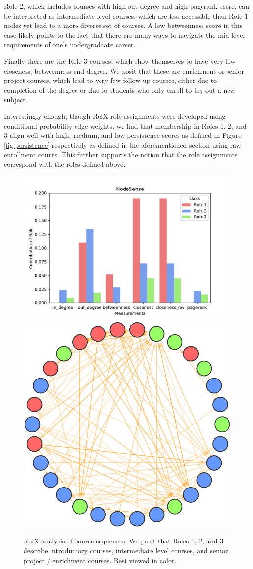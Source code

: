 \documentclass{sigchi}
\begin{document}
Role 2, which includes courses with high out-degree and high pagerank score, can be interpreted as intermediate level courses, which are less accessible than Role 1 nodes yet lead to a more diverse set of courses. A low betweenness score in this case likely points to the fact that there are many ways to navigate the mid-level requirements of one's undergraduate career. 

Finally there are the Role 3 courses, which show themselves to have very low closeness, betweenness and degree. We posit that these are enrichment or senior project courses, which lead to very few follow up courses, either due to completion of the degree or due to students who only enroll to try out a new subject.  

Interestingly enough, though RolX role assignments were developed using conditional probability edge weights, we find that membership in Roles 1, 2, and 3 align well with high, medium, and low persistence scores as defined in Figure \ref{fig:persistence} respectively as defined in the aforementioned section using raw enrollment counts. This further supports the notion that the role assignments correspond with the roles defined above.

\begin{figure}
    \centering
    \includegraphics[width=0.75\columnwidth]{final-rolx-sense.pdf}
    \includegraphics[width=0.24\columnwidth]{final-rolx.pdf}
    \caption{RolX analysis of course sequences. We posit that Roles 1, 2, and 3 describe introductory courses, intermediate level courses, and senior project / enrichment courses. Best viewed in color.}
    \label{fig:rolx}
\end{figure}
\end{document}
